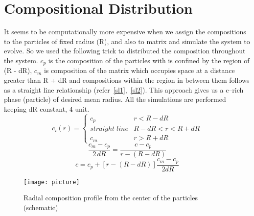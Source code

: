 \documentclass[12pt]{iiscthes}
\theoremstyle{definition}
\theoremstyle{definition}
\theoremstyle{remark}
\begin{document}
\section{Compositional Distribution}
It seems to be computationally more expensive when we assign the compositions to the particles of fixed radius (R), and  also to matrix and simulate the system to evolve. So we used the following trick to distributed the composition throughout the system. $c_p$ is the composition of the particles with is confined by the region of (R - dR), $c_m$ is composition of the matrix which occupies space at a distance greater than R + dR and compositions within the region in between them follows as a straight line relationship (refer~\ref{sl1},~\ref{sl2}). This approach gives us a c--rich phase (particle) of desired mean radius. All the simulations are performed keeping dR constant, 4 unit.
\[ 
c_i (r) = \left\{ 
\begin{array}{lr}
c_p & r < R - dR\\
straight\;line & R - dR < r < R + dR\\
c_m & r > R + dR
\end{array}
\right.
\]
\begin{equation}\label{sl1}
\frac{c_m - c_p}{2\,dR} = \frac{c - c_p}{r - (R - dR)}
\end{equation}
\begin{equation}\label{sl2}
c = c_p +\left[r - (R - dR)\right]\frac{c_m - c_p}{2 dR}
\end{equation}
\vspace{-20pt}
\begin{figure}[H]
\centering
\texttt{[image: picture]}
\caption{Radial composition profile from the center of the particles (schematic)}
\label{cd}
\end{figure}
\end{document}
